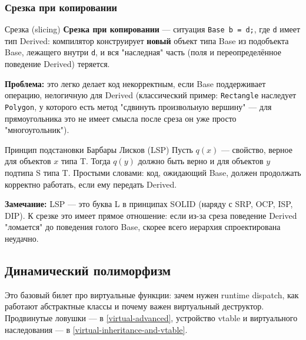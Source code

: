 \subsubsection{Срезка при копировании}
\begin{definition}{Срезка (slicing)}{}
\textbf{Срезка при копировании} --- ситуация \texttt{Base b = d;}, где \texttt{d} имеет тип Derived: компилятор конструирует \textbf{новый} объект типа Base из подобъекта Base, лежащего внутри \texttt{d}, и вся "наследная" часть (поля и переопределённое поведение Derived) теряется.
\end{definition}
\textbf{Проблема:} это легко делает код некорректным, если Base поддерживает операцию, нелогичную для Derived (классический пример: \texttt{Rectangle} наследует \texttt{Polygon}, у которого есть метод "сдвинуть произвольную вершину" --- для прямоугольника это не имеет смысла после среза он уже просто "многоугольник").
\begin{definition}{Принцип подстановки Барбары Лисков (LSP)}{}
Пусть $q(x)$ --- свойство, верное для объектов $x$ типа T. Тогда $q(y)$ должно быть верно и для объектов $y$ подтипа S типа T. Простыми словами: код, ожидающий Base, должен продолжать корректно работать, если ему передать Derived.
\end{definition}
\textbf{Замечание:} LSP --- это буква L в принципах SOLID (наряду с SRP, OCP, ISP, DIP). К срезке это имеет прямое отношение: если из-за среза поведение Derived "ломается" до поведения голого Base, скорее всего иерархия спроектирована неудачно.

\subsection{Динамический полиморфизм} \label{dynamic-polymorphism-basic}
Это базовый билет про виртуальные функции: зачем нужен runtime dispatch, как работают абстрактные классы и почему важен виртуальный деструктор. Продвинутые ловушки --- в \ref{virtual-advanced}, устройство vtable и виртуального наследования --- в \ref{virtual-inheritance-and-vtable}.
